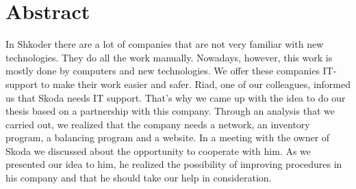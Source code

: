 %
%
\newpage

%
%
\section*{Abstract}
In Shkoder there are a lot of companies that are not very familiar with new
technologies. They do all the work manually. Nowadays, however, this work is mostly
done by computers and new technologies. We offer these companies IT-support to
make their work easier and safer. Riad, one of our colleagues, informed us that
Skoda needs IT support. That's why we came up with the idea to do our thesis based
on a partnership with this company. Through an analysis that we carried out, we
realized that the company needs a network, an inventory program, a balancing
program and a website. In a meeting with the owner of Skoda we discussed about
the opportunity to cooperate with him. As we presented our idea to him, he realized
the possibility of improving procedures in his company and that he should take our
help in consideration.
 

